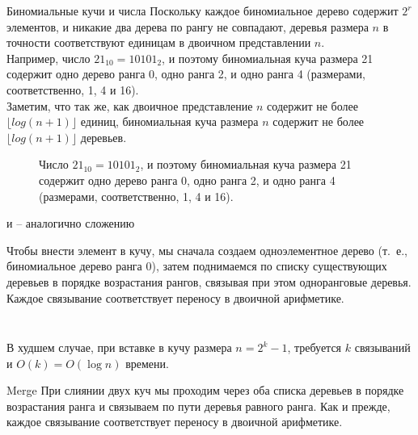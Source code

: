 \begin{frame}[fragile]{Биномиальные кучи и числа}
Поскольку каждое биномиальное дерево содержит $2^r$ элементов, и
никакие два дерева по рангу не совпадают, деревья размера $n$ в
точности соответствуют единицам в двоичном представлении
$n$.\\

Например, число $21_{10} = 10101_2$, и поэтому
биномиальная куча размера 21 содержит одно дерево ранга 0, одно ранга
2, и одно ранга 4 (размерами, соответственно, 1, 4 и 16).\\

Заметим, что
так же, как двоичное представление $n$ содержит не более $\lfloor log
(n+1)\rfloor$ единиц, биномиальная куча размера $n$ содержит не более
$\lfloor log(n+1) \rfloor$ деревьев.
\end{frame}


\begin{frame}[fragile]{}
\begin{figure}[h]
  \centering
  
  \caption{Число $21_{10} = 10101_2$, и поэтому
    биномиальная куча размера 21 содержит одно дерево ранга 0, одно ранга
    2, и одно ранга 4 (размерами, соответственно, 1, 4 и 16).}
\end{figure}

\end{frame}


\begin{frame}[fragile]{ и  -- аналогично сложению}

Чтобы внести элемент в кучу,
мы сначала создаем одноэлементное дерево (т.~е., биномиальное дерево
ранга 0), затем поднимаемся по списку существующих деревьев в порядке
возрастания рангов, связывая при этом одноранговые деревья. Каждое
связывание соответствует переносу в двоичной арифметике.

\inputminted[firstline=8,lastline=8] {haskell}{code/BinomialHeap.lhs}
\inputminted[firstline=16,lastline=18] {haskell}{code/BinomialHeap.lhs}

В худшем случае, при вставке в кучу размера $n = 2^k -1$, требуется
$k$ связываний и $O(k) = O(\log n)$ времени.
\end{frame}


\begin{frame}[fragile]{Merge}
При слиянии двух куч мы проходим через оба списка деревьев в порядке
возрастания ранга и связываем по пути деревья равного ранга. Как и
прежде, каждое связывание соответствует переносу в двоичной
арифметике.

\inputminted[firstline=20,lastline=25] {haskell}{code/BinomialHeap.lhs}

\inputminted[firstline=38,lastline=38,gobble=2] {haskell}{code/BinomialHeap.lhs}

\end{frame}

